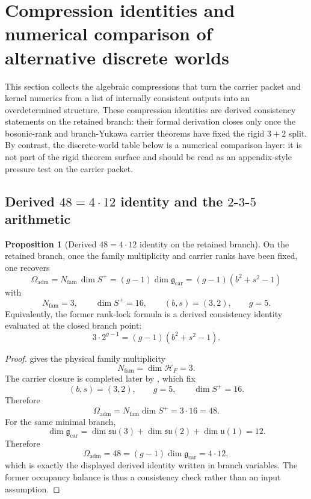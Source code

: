 \documentclass[11pt,a4paper]{article}
\theoremstyle{definition}
\newtheorem{proposition}[theorem]{Proposition}
\theoremstyle{remark}
\newcommand{\Oadm}{\Omega_{\mathrm{adm}}}
\begin{document}
\section{Compression identities and numerical comparison of alternative discrete worlds}

This section collects the algebraic compressions that turn the carrier packet and kernel numerics
from a list of internally consistent outputs into an overdetermined structure. These compression
identities are derived consistency statements on the retained branch: their formal derivation closes
only once the bosonic-rank and branch-Yukawa carrier theorems have fixed the rigid $3+2$ split. By
contrast, the discrete-world table below is a numerical comparison layer: it is not part of the
rigid theorem surface and should be read as an appendix-style pressure test on the carrier packet.

\subsection{Derived \texorpdfstring{$48=4\cdot12$}{48=4·12} identity and the \texorpdfstring{$2$-$3$-$5$}{2-3-5} arithmetic}

\begin{proposition}[Derived \texorpdfstring{$48=4\cdot12$}{48=4·12} identity on the retained branch]
\label{prop:rank-lock}
On the retained branch, once the family multiplicity and carrier ranks have been fixed, one
recovers
\[
\Oadm
=
N_{\mathrm{fam}}\,\dim S^+
=
(g-1)\dim\mathfrak g_{\mathrm{car}}
=
(g-1)(b^2+s^2-1)
\]
with
\[
N_{\mathrm{fam}}=3,
\qquad
\dim S^+=16,
\qquad
(b,s)=(3,2),
\qquad
g=5.
\]
Equivalently, the former rank-lock formula is a derived consistency identity evaluated at the
closed branch point:
\begin{equation}
\label{eq:rank-lock}
3\cdot 2^{g-1}=(g-1)(b^2+s^2-1).
\end{equation}
\end{proposition}

\begin{proof}
 gives the physical family multiplicity
\[
N_{\mathrm{fam}}=\dim\mathcal H_F=3.
\]
The carrier closure is completed later by , which
fix
\[
(b,s)=(3,2),
\qquad
g=5,
\qquad
\dim S^+=16.
\]
Therefore
\[
\Oadm=N_{\mathrm{fam}}\dim S^+=3\cdot16=48.
\]
For the same minimal branch,
\[
\dim\mathfrak g_{\mathrm{car}}
=
\dim\mathfrak{su}(3)+\dim\mathfrak{su}(2)+\dim\mathfrak u(1)
=
12.
\]
Therefore
\[
\Oadm=48=(g-1)\dim\mathfrak g_{\mathrm{car}}=4\cdot 12,
\]
which is exactly the displayed derived identity written in branch variables. The former occupancy
balance is thus a consistency check rather than an input assumption.
\end{proof}
\end{document}
